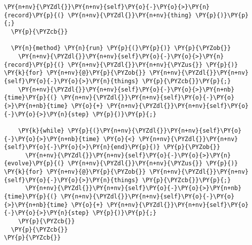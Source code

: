 \begin{Verbatim}[commandchars=\\\{\}]
    \PY{n+nv}{\PYZdl{}}\PY{n+nv}{self}\PY{o}{-}\PY{o}{>}\PY{n}{record}\PY{p}{(} \PY{n+nv}{\PYZdl{}}\PY{n+nv}{thing} \PY{p}{)}\PY{p}{;}
  \PY{p}{\PYZcb{}}

  \PY{n}{method} \PY{n}{run} \PY{p}{(}\PY{p}{)} \PY{p}{\PYZob{}}
    \PY{n+nv}{\PYZdl{}}\PY{n+nv}{self}\PY{o}{-}\PY{o}{>}\PY{n}{record}\PY{p}{(} \PY{n+nv}{\PYZdl{}}\PY{n+nv}{\PYZus{}} \PY{p}{)} \PY{k}{for} \PY{n+nv}{@}\PY{p}{\PYZob{}} \PY{n+nv}{\PYZdl{}}\PY{n+nv}{self}\PY{o}{-}\PY{o}{>}\PY{n}{things} \PY{p}{\PYZcb{}}\PY{p}{;}
    \PY{n+nv}{\PYZdl{}}\PY{n+nv}{self}\PY{o}{-}\PY{o}{>}\PY{n+nb}{time}\PY{p}{(} \PY{n+nv}{\PYZdl{}}\PY{n+nv}{self}\PY{o}{-}\PY{o}{>}\PY{n+nb}{time} \PY{o}{+} \PY{n+nv}{\PYZdl{}}\PY{n+nv}{self}\PY{o}{-}\PY{o}{>}\PY{n}{step} \PY{p}{)}\PY{p}{;}

    \PY{k}{while} \PY{p}{(}\PY{n+nv}{\PYZdl{}}\PY{n+nv}{self}\PY{o}{-}\PY{o}{>}\PY{n+nb}{time} \PY{o}{<} \PY{n+nv}{\PYZdl{}}\PY{n+nv}{self}\PY{o}{-}\PY{o}{>}\PY{n}{end}\PY{p}{)} \PY{p}{\PYZob{}}
      \PY{n+nv}{\PYZdl{}}\PY{n+nv}{self}\PY{o}{-}\PY{o}{>}\PY{n}{evolve}\PY{p}{(} \PY{n+nv}{\PYZdl{}}\PY{n+nv}{\PYZus{}} \PY{p}{)} \PY{k}{for} \PY{n+nv}{@}\PY{p}{\PYZob{}} \PY{n+nv}{\PYZdl{}}\PY{n+nv}{self}\PY{o}{-}\PY{o}{>}\PY{n}{things} \PY{p}{\PYZcb{}}\PY{p}{;}
      \PY{n+nv}{\PYZdl{}}\PY{n+nv}{self}\PY{o}{-}\PY{o}{>}\PY{n+nb}{time}\PY{p}{(} \PY{n+nv}{\PYZdl{}}\PY{n+nv}{self}\PY{o}{-}\PY{o}{>}\PY{n+nb}{time} \PY{o}{+} \PY{n+nv}{\PYZdl{}}\PY{n+nv}{self}\PY{o}{-}\PY{o}{>}\PY{n}{step} \PY{p}{)}\PY{p}{;}
    \PY{p}{\PYZcb{}}
  \PY{p}{\PYZcb{}}
\PY{p}{\PYZcb{}}
\end{Verbatim}
